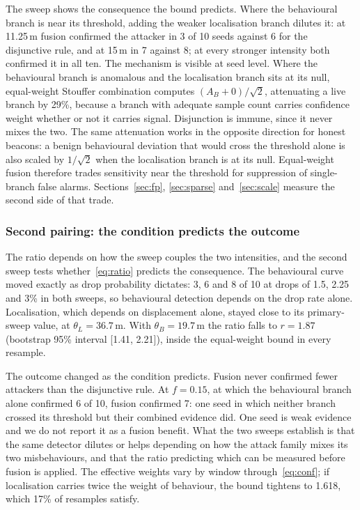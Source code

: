 The sweep shows the consequence the bound predicts. Where the behavioural
branch is near its threshold, adding the weaker localisation branch dilutes
it: at 11.25\,m fusion confirmed the attacker in 3 of 10 seeds against 6 for
the disjunctive rule, and at 15\,m in 7 against 8; at every stronger intensity
both confirmed it in all ten. The mechanism is visible at seed level. Where the
behavioural branch is anomalous and the localisation branch sits at its null,
equal-weight Stouffer combination computes $(A_B + 0)/\sqrt2$, attenuating a
live branch by 29\%, because a branch with adequate sample count carries
confidence weight whether or not it carries signal. Disjunction is immune,
since it never mixes the two. The same attenuation works in the opposite
direction for honest beacons: a benign behavioural deviation that would cross
the threshold alone is also scaled by $1/\sqrt2$ when the localisation branch
is at its null. Equal-weight fusion therefore trades sensitivity near the
threshold for suppression of single-branch false alarms. Sections~\ref{sec:fp},
\ref{sec:sparse} and~\ref{sec:scale} measure the second side of that trade.

\subsubsection{Second pairing: the condition predicts the outcome}

The ratio depends on how the sweep couples the two intensities, and the second
sweep tests whether~\eqref{eq:ratio} predicts the consequence. The behavioural
curve moved exactly as drop probability dictates: 3, 6 and 8 of 10 at drops of
1.5, 2.25 and 3\% in both sweeps, so behavioural detection depends on the drop
rate alone. Localisation, which depends on displacement alone, stayed close
to its primary-sweep value, at $\theta_L = 36.7$\,m. With $\theta_B = 19.7$\,m the ratio falls to $r = 1.87$
(bootstrap 95\% interval [1.41, 2.21]), inside the equal-weight bound in every
resample.

The outcome changed as the condition predicts. Fusion never confirmed fewer
attackers than the disjunctive rule. At $f = 0.15$, at which the behavioural
branch alone confirmed 6 of 10, fusion confirmed 7: one seed in which neither
branch crossed its threshold but their combined evidence did. One seed is weak
evidence and we do not report it as a fusion benefit. What the two sweeps
establish is that the same detector dilutes or helps depending on how the
attack family mixes its two misbehaviours, and that the ratio predicting which
can be measured before fusion is applied. The effective weights vary by window
through~\eqref{eq:conf}; if localisation carries twice the weight of behaviour,
the bound tightens to 1.618, which 17\% of resamples satisfy.

